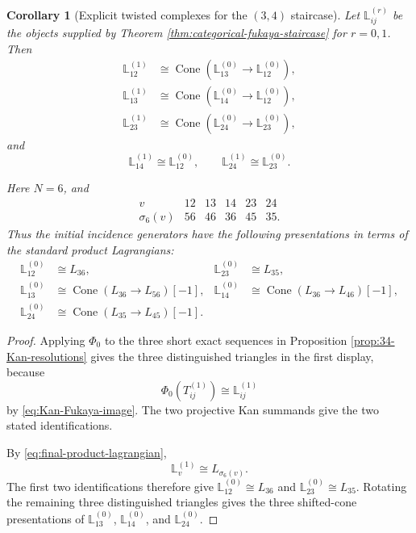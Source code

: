 \documentclass[12pt,a4paper,english,reqno]{amsart}
\theoremstyle{plain}
\newtheorem{corollary}[theorem]{Corollary}
\theoremstyle{definition}
\begin{document}
\begin{corollary}[Explicit twisted complexes for the $(3,4)$ staircase]
\label{cor:34-twisted-complexes}
Let $\mathbb L_{ij}^{(r)}$ be the objects supplied by Theorem 
\ref{thm:categorical-fukaya-staircase} for $r=0,1$.  Then
\[
\begin{aligned}
 \mathbb L_{12}^{(1)}
 &\cong
 \operatorname{Cone}\!
 \left(
  \mathbb L_{13}^{(0)}
  \longrightarrow
  \mathbb L_{12}^{(0)}
 \right),\\
 \mathbb L_{13}^{(1)}
 &\cong
 \operatorname{Cone}\!
 \left(
  \mathbb L_{14}^{(0)}
  \longrightarrow
  \mathbb L_{12}^{(0)}
 \right),\\
 \mathbb L_{23}^{(1)}
 &\cong
 \operatorname{Cone}\!
 \left(
  \mathbb L_{24}^{(0)}
  \longrightarrow
  \mathbb L_{23}^{(0)}
 \right),
\end{aligned}
\]
and
\[
 \mathbb L_{14}^{(1)}\cong\mathbb L_{12}^{(0)},
 \qquad
 \mathbb L_{24}^{(1)}\cong\mathbb L_{23}^{(0)}.
\]

Here $N=6$, and
\[
\begin{array}{c|ccccc}
v&12&13&14&23&24\\ \hline
\sigma_6(v)&56&46&36&45&35.
\end{array}
\]
Thus the initial incidence generators have the following presentations in
terms of the standard product Lagrangians:
\[
\begin{aligned}
 \mathbb L_{12}^{(0)}
 &\cong L_{36},&
 \mathbb L_{23}^{(0)}
 &\cong L_{35},\\
 \mathbb L_{13}^{(0)}
 &\cong
 \operatorname{Cone}(L_{36}\longrightarrow L_{56})[-1],&
 \mathbb L_{14}^{(0)}
 &\cong
 \operatorname{Cone}(L_{36}\longrightarrow L_{46})[-1],\\
 \mathbb L_{24}^{(0)}
 &\cong
 \operatorname{Cone}(L_{35}\longrightarrow L_{45})[-1].
\end{aligned}
\]
\end{corollary}

\begin{proof}
Applying $\Phi_0$ to the three short exact sequences in
Proposition \ref{prop:34-Kan-resolutions} gives the three distinguished triangles in
the first display, because
\[
 \Phi_0(T_{ij}^{(1)})\cong\mathbb L_{ij}^{(1)}
\]
by \eqref{eq:Kan-Fukaya-image}.  The two projective Kan summands give the
two stated identifications.

By \eqref{eq:final-product-lagrangian},
\[
 \mathbb L_v^{(1)}\cong L_{\sigma_6(v)}.
\]
The first two identifications therefore give
$\mathbb L_{12}^{(0)}\cong L_{36}$ and
$\mathbb L_{23}^{(0)}\cong L_{35}$.  Rotating the remaining three
distinguished triangles gives the three shifted-cone presentations of
$\mathbb L_{13}^{(0)}$, $\mathbb L_{14}^{(0)}$, and
$\mathbb L_{24}^{(0)}$.
\end{proof}
\end{document}
